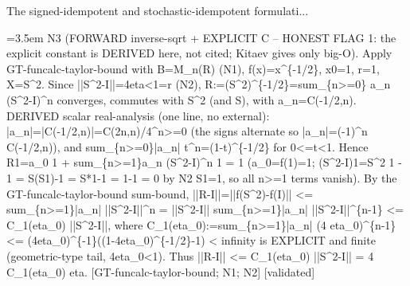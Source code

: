 \documentclass{article}
\newcommand{\step}[1]{\par\noindent\hangindent=3.5em\hangafter=1%
  \makebox[3.5em][l]{\textbf{#1.}}}
\newcommand{\steptag}[1]{\hfill{\small\textsf{[#1]}}}
\begin{document}
\begin{proofbox}{The signed-idempotent and stochastic-idempotent formulati...}
\step{1.3} N3 (FORWARD inverse-sqrt + EXPLICIT C -- HONEST FLAG 1: the explicit constant is DERIVED here, not cited; Kitaev gives only big-O). Apply GT-funcalc-taylor-bound with B=M\_n(R) (N1), f(x)=x\textasciicircum{}\{-1/2\}, x0=1, r=1, X=S\textasciicircum{}2. Since ||S\textasciicircum{}2-I||=4eta<1=r (N2), R:=(S\textasciicircum{}2)\textasciicircum{}\{-1/2\}=sum\_\{n>=0\} a\_n (S\textasciicircum{}2-I)\textasciicircum{}n converges, commutes with S\textasciicircum{}2 (and S), with a\_n=C(-1/2,n). DERIVED scalar real-analysis (one line, no external): |a\_n|=|C(-1/2,n)|=C(2n,n)/4\textasciicircum{}n>=0 (the signs alternate so |a\_n|=(-1)\textasciicircum{}n C(-1/2,n)), and sum\_\{n>=0\}|a\_n| t\textasciicircum{}n=(1-t)\textasciicircum{}\{-1/2\} for 0<=t<1. Hence R1=a\_0 1 + sum\_\{n>=1\}a\_n (S\textasciicircum{}2-I)\textasciicircum{}n 1 = 1 (a\_0=f(1)=1; (S\textasciicircum{}2-I)1=S\textasciicircum{}2 1 - 1 = S(S1)-1 = S*1-1 = 1-1 = 0 by N2 S1=1, so all n>=1 terms vanish). By the GT-funcalc-taylor-bound sum-bound, ||R-I||=||f(S\textasciicircum{}2)-f(I)|| <= sum\_\{n>=1\}|a\_n| ||S\textasciicircum{}2-I||\textasciicircum{}n = ||S\textasciicircum{}2-I|| sum\_\{n>=1\}|a\_n| ||S\textasciicircum{}2-I||\textasciicircum{}\{n-1\} <= C\_1(eta\_0) ||S\textasciicircum{}2-I||, where C\_1(eta\_0):=sum\_\{n>=1\}|a\_n| (4 eta\_0)\textasciicircum{}\{n-1\} <= (4eta\_0)\textasciicircum{}\{-1\}((1-4eta\_0)\textasciicircum{}\{-1/2\}-1) < infinity is EXPLICIT and finite (geometric-type tail, 4eta\_0<1). Thus ||R-I|| <= C\_1(eta\_0) ||S\textasciicircum{}2-I|| = 4 C\_1(eta\_0) eta. [GT-funcalc-taylor-bound; N1; N2] \steptag{validated} \\[4pt]

\end{proofbox}
\end{document}
